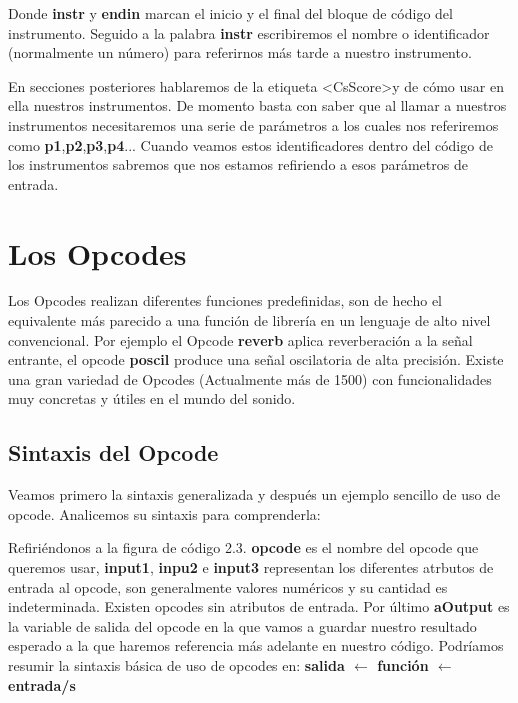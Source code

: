 
Donde \textbf{instr} y \textbf{endin} marcan el inicio y el final del bloque de código del instrumento. Seguido a la palabra \textbf{instr} escribiremos el nombre o identificador (normalmente un número) para referirnos más tarde a nuestro instrumento.

En secciones posteriores hablaremos de la etiqueta \textless CsScore\textgreater y de cómo usar en ella nuestros instrumentos. De momento basta con saber que al llamar a nuestros instrumentos necesitaremos una serie de parámetros a los cuales nos referiremos como \textbf{p1},\textbf{p2},\textbf{p3},\textbf{p4}... Cuando veamos estos identificadores dentro del código de los instrumentos sabremos que nos estamos refiriendo a esos parámetros de entrada.
 

\section{Los Opcodes}\label{sec:Opcodes}

Los Opcodes realizan diferentes funciones predefinidas, son de hecho el equivalente más parecido a una función de librería en un lenguaje de alto nivel convencional. Por ejemplo el Opcode \textbf{reverb} aplica reverberación a la señal entrante, el opcode \textbf{poscil} produce una señal oscilatoria de alta precisión. Existe una gran variedad de Opcodes (Actualmente más de 1500) con funcionalidades muy concretas y útiles en el mundo del sonido.

\subsection{Sintaxis del Opcode}\label{sec:SyntaxOpcodes}

Veamos primero la sintaxis generalizada y después un ejemplo sencillo de uso de opcode. Analicemos su sintaxis para comprenderla:


Refiriéndonos a la figura de código 2.3. \textbf{opcode} es el nombre del opcode que queremos usar, \textbf{input1}, \textbf{inpu2} e \textbf{input3} representan los diferentes atrbutos de entrada al opcode, son generalmente valores numéricos y su cantidad es indeterminada. Existen opcodes sin atributos de entrada. Por último \textbf{aOutput} es la variable de salida del opcode en la que vamos a guardar nuestro resultado esperado a la que haremos referencia más adelante en nuestro código.
Podríamos resumir la sintaxis básica de uso de opcodes en: \textbf{salida $\leftarrow$ función $\leftarrow$ entrada/s} 

